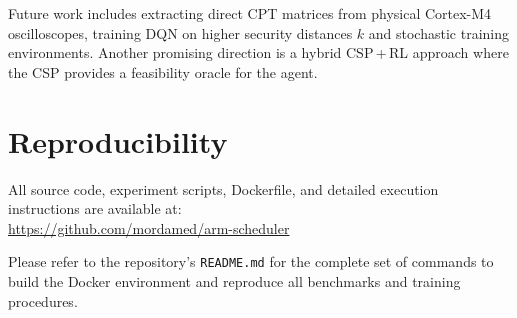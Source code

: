 \documentclass[letterpaper]{article}
\begin{document}
Future work includes extracting direct CPT matrices from physical Cortex-M4
oscilloscopes, training DQN on higher security distances $k$
and stochastic training environments.
Another promising direction is a  hybrid CSP\,+\,RL
approach where the CSP provides a feasibility oracle for the agent.

\section{Reproducibility}
All source code, experiment scripts, Dockerfile, and detailed execution
instructions are available at:\\
\url{https://github.com/mordamed/arm-scheduler}

\noindent Please refer to the repository's \texttt{README.md} for the complete set of commands to build the Docker environment and reproduce all benchmarks and training procedures.



\end{document}
